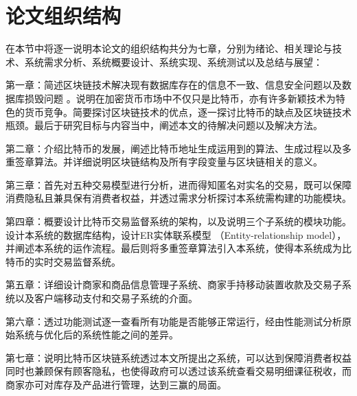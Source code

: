 	\section{论文组织结构}
	在本节中将逐一说明本论文的组织结构共分为七章，分别为绪论、相关理论与技术、系统需求分析、系统概要设计、系统实现、系统测试以及总结与展望：

	第一章：简述区块链技术解决现有数据库存在的信息不一致、信息安全问题以及数据库损毁问题
	。说明在加密货币市场中不仅只是比特币，亦有许多新颖技术为特色的货币竞争。简要探讨区块链技术的优点，逐一探讨比特币的缺点及区块链技术瓶颈。最后于研究目标与内容当中，阐述本文的待解决问题以及解决方法。

	第二章：介绍比特币的发展，阐述比特币地址生成运用到的算法、生成过程以及多重签章算法。并详细说明区块链结构及所有字段变量与区块链相关的意义。

	第三章：首先对五种交易模型进行分析，进而得知匿名对实名的交易，既可以保障消费隐私且兼具保有消费者权益，并透过需求分析探讨本系统需构建的功能模块。

	第四章：概要设计比特币交易监督系统的架构，以及说明三个子系统的模块功能。设计本系统的数据库结构，设计ER实体联系模型 （Entity-relationship model），并阐述本系统的运作流程。最后则将多重签章算法引入本系统，使得本系统成为比特币的实时交易监督系统。

	第五章：详细设计商家和商品信息管理子系统、商家手持移动装置收款及交易子系统以及客户端移动支付和交易子系统的介面。

	第六章：透过功能测试逐一查看所有功能是否能够正常运行，经由性能测试分析原始系统与优化后的系统性能之间的差异。

	第七章：说明比特币区块链系统透过本文所提出之系统，可以达到保障消费者权益同时也兼顾保有顾客隐私，也使得政府可以透过该系统查看交易明细课征税收，而商家亦可对库存及产品进行管理，达到三赢的局面。
